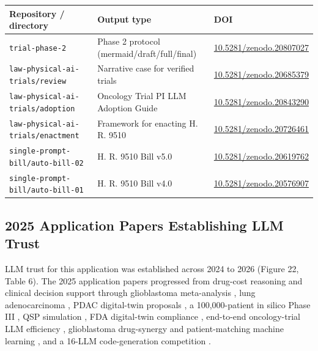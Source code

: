 \vspace{0.2em}
\noindent\begin{tabularx}{\textwidth}{L{4.4cm} L{3.6cm} Y}
\toprule
\textbf{Repository / directory} & \textbf{Output type} & \textbf{DOI} \\
\midrule
\texttt{trial-phase-2} & Phase 2 protocol (mermaid/draft/full/final) & \href{https://doi.org/10.5281/zenodo.20807027}{10.5281/zenodo.20807027} \\
\texttt{law-physical-ai-trials/review} & Narrative case for verified trials & \href{https://doi.org/10.5281/zenodo.20685379}{10.5281/zenodo.20685379} \\
\texttt{law-physical-ai-trials/adoption} & Oncology Trial PI LLM Adoption Guide & \href{https://doi.org/10.5281/zenodo.20843290}{10.5281/zenodo.20843290} \\
\texttt{law-physical-ai-trials/enactment} & Framework for enacting H. R. 9510 & \href{https://doi.org/10.5281/zenodo.20726461}{10.5281/zenodo.20726461} \\
\texttt{single-prompt-bill/auto-bill-02} & H. R. 9510 Bill v5.0 & \href{https://doi.org/10.5281/zenodo.20619762}{10.5281/zenodo.20619762} \\
\texttt{single-prompt-bill/auto-bill-01} & H. R. 9510 Bill v4.0 & \href{https://doi.org/10.5281/zenodo.20576907}{10.5281/zenodo.20576907} \\
\bottomrule
\end{tabularx}

\subsection{2025 Application Papers Establishing LLM Trust}

LLM trust for this application was established across 2024 to 2026 (Figure 22,
Table 6). The 2025 application papers progressed from drug-cost reasoning and
clinical decision support \cite{bevacds, costmab, autollmagent} through glioblastoma
meta-analysis
\cite{gbmmeta10yr}, lung adenocarcinoma \cite{lungadeno}, PDAC digital-twin
proposals \cite{kawchak_2025_15735068}, a 100,000-patient in silico Phase III
\cite{kawchak_2025_16415815}, QSP simulation \cite{kawchak_2025_17001137}, FDA
digital-twin compliance \cite{kawchak_2025_17239510}, end-to-end oncology-trial LLM
efficiency \cite{e2eoncoeff}, glioblastoma drug-synergy and patient-matching
machine learning \cite{gbmsynergy, aipeerreview}, and a 16-LLM code-generation
competition \cite{codegen16}.

